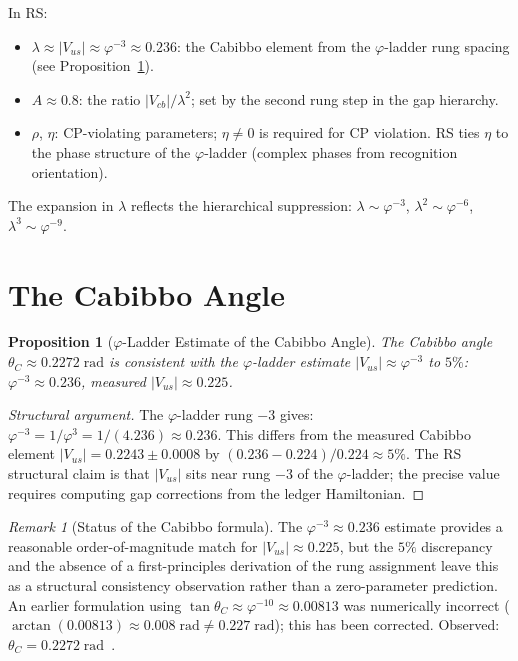 \documentclass[12pt,a4paper]{article}
\newtheorem{proposition}[theorem]{Proposition}
\theoremstyle{definition}
\theoremstyle{remark}
\newtheorem{remark}[theorem]{Remark}
\begin{document}
In RS:
\begin{itemize}[noitemsep]
  \item $\lambda \approx |V_{us}| \approx \varphi^{-3} \approx 0.236$: the
    Cabibbo element from the $\varphi$-ladder rung spacing (see
    Proposition~\ref{prop:cabibbo}).
  \item $A \approx 0.8$: the ratio $|V_{cb}|/\lambda^2$; set by the
    second rung step in the gap hierarchy.
  \item $\rho$, $\eta$: CP-violating parameters; $\eta \neq 0$ is
    required for CP violation.  RS ties $\eta$ to the phase
    structure of the $\varphi$-ladder (complex phases from
    recognition orientation).
\end{itemize}

The expansion in $\lambda$ reflects the hierarchical suppression:
$\lambda \sim \varphi^{-3}$, $\lambda^2 \sim \varphi^{-6}$,
$\lambda^3 \sim \varphi^{-9}$.

\section{The Cabibbo Angle}
\label{sec:cabibbo}

\begin{proposition}[$\varphi$-Ladder Estimate of the Cabibbo Angle]
\label{prop:cabibbo}
The Cabibbo angle $\theta_C \approx 0.2272\;\mathrm{rad}$ is consistent
with the $\varphi$-ladder estimate $|V_{us}| \approx \varphi^{-3}$
to $5\%$:
$\varphi^{-3} \approx 0.236$, measured $|V_{us}| \approx 0.225$.
\end{proposition}

\begin{proof}[Structural argument]
The $\varphi$-ladder rung $-3$ gives:
$\varphi^{-3} = 1/\varphi^3 = 1/(4.236) \approx 0.236$.
This differs from the measured Cabibbo element $|V_{us}| = 0.2243 \pm 0.0008$
by $(0.236 - 0.224)/0.224 \approx 5\%$.  The RS structural claim is
that $|V_{us}|$ sits near rung $-3$ of the $\varphi$-ladder; the
precise value requires computing gap corrections from the ledger
Hamiltonian.
\end{proof}

\begin{remark}[Status of the Cabibbo formula]
\label{rem:cabibbo-status}
The $\varphi^{-3} \approx 0.236$ estimate provides a reasonable
order-of-magnitude match for $|V_{us}| \approx 0.225$, but the $5\%$
discrepancy and the absence of a first-principles derivation of the
rung assignment leave this as a structural consistency observation
rather than a zero-parameter prediction.  An earlier formulation
using $\tan\theta_C \approx \varphi^{-10} \approx 0.00813$ was
numerically incorrect ($\arctan(0.00813) \approx 0.008\;\mathrm{rad}
\neq 0.227\;\mathrm{rad}$); this has been corrected.
Observed: $\theta_C = 0.2272\;\mathrm{rad}$~\cite{PDG2024}.
\end{remark}
\end{document}
